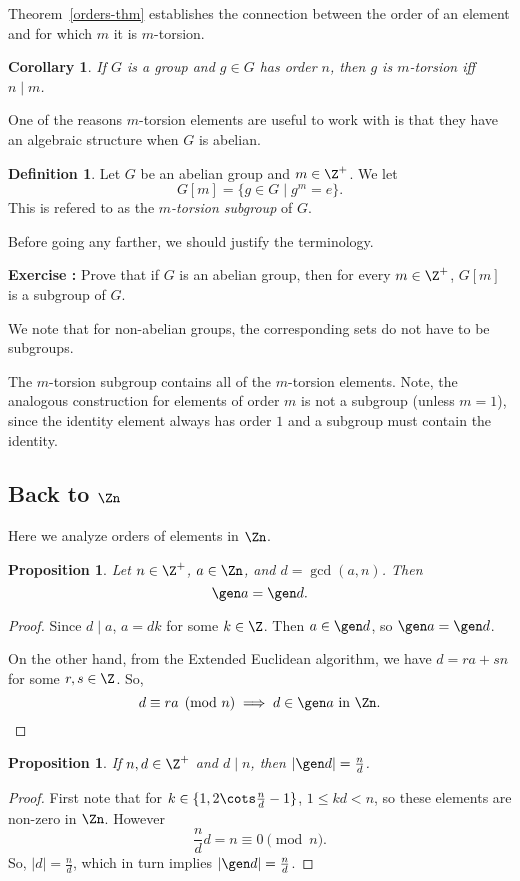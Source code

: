\documentclass[12pt]{amsart}
\newcounter{probs}
\newenvironment{prob}{%
  \refstepcounter{probs}
  \par\medskip\noindent\textbf{Exercise \theprobs:} }{\par\medskip}
\theoremstyle{plain}
\newtheorem{prop}[thm]{Proposition}
\newtheorem{cor}[thm]{Corollary}
\theoremstyle{definition}
\newtheorem{defn}[thm]{Definition}
\theoremstyle{remark}
\begin{document}
Theorem~\ref{orders-thm} establishes the connection between the
order of an element and for which $m$ it is $m$-torsion.
\begin{cor}
  If $G$ is a group and $g\in G$ has order $n$, then $g$ is
  $m$-torsion iff $n \mid m$.
\end{cor}
One of the reasons $m$-torsion elements are useful to work with is
that they have an algebraic structure when $G$ is abelian.
\begin{defn}
  Let $G$ be an abelian group and $m\in\Z^+$.  We let
  \[ G[m] = \{g\in G\mid g^m=e\}.\]
  This is refered to as the \emph{$m$-torsion subgroup} of $G$.
\end{defn}
Before going any farther, we should justify the terminology.
\begin{prob}
  Prove that if $G$ is an abelian group, then for every $m\in\Z^+$,
  $G[m]$ is a subgroup of $G$.
\end{prob}
We note that for non-abelian groups, the corresponding sets do not
have to be subgroups.

The $m$-torsion subgroup contains all of the $m$-torsion elements.
Note, the analogous construction for elements of order $m$ is not a
subgroup (unless $m=1$), since the identity element always has order
$1$ and a subgroup must contain the identity.


\subsection{Back to $\Zn$}\label{zn2}
Here we analyze orders of elements in $\Zn$.
\begin{prop} \label{imageszn}
  Let $n\in\Z^+$, $a\in \Zn$, and $d=\gcd(a,n)$.  Then
  \[ \gen a = \gen d.\]
\end{prop}
\begin{proof}
  Since $d\mid a$, $a=dk$ for some $k\in \Z$.  Then $a\in \gen d$, so
  $\gen a = \gen d$.

  On the other hand, from the Extended Euclidean algorithm, we have
  $d=ra+sn$ for some $r,s\in\Z$.  So, 
  \[ d\equiv ra\pmod n \implies d\in \gen a \text{ in $\Zn$.}\]
\end{proof}  
\begin{prop}
  If $n,d\in\Z^+$ and $d\mid n$, then $|\gen d|=\frac n d$.
\end{prop}
\begin{proof}
  First note that for $k\in \{1,2\cots \frac n d -1\}$, $1\leq kd <
  n$, so these elements are non-zero in $\Zn$.  However 
 \[ \frac n d d = n \equiv 0\pmod n.\]
  So, $|d|=\frac n d$, which in turn implies $|\gen d|=\frac n d$.
\end{proof}
\end{document}
